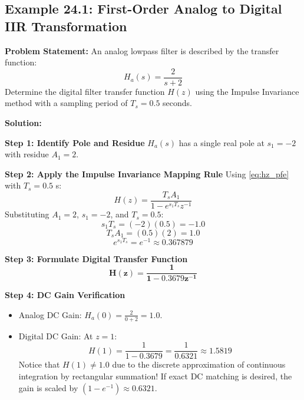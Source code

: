 \documentclass[11pt,a4paper]{article}
\begin{document}
\subsection{Example 24.1: First-Order Analog to Digital IIR Transformation}
\textbf{Problem Statement:} An analog lowpass filter is described by the transfer function:
\begin{equation}
H_a(s) = \frac{2}{s + 2}
\end{equation}
Determine the digital filter transfer function $H(z)$ using the Impulse Invariance method with a sampling period of $T_s = 0.5$ seconds.

\vspace{1mm}
\noindent\textbf{Solution:}

\noindent\textbf{Step 1: Identify Pole and Residue}
$H_a(s)$ has a single real pole at $s_1 = -2$ with residue $A_1 = 2$.

\noindent\textbf{Step 2: Apply the Impulse Invariance Mapping Rule}
Using \eqref{eq:hz_pfe} with $T_s = 0.5$ s:
\begin{equation}
H(z) = \frac{T_s A_1}{1 - e^{s_1 T_s} z^{-1}}
\end{equation}
Substituting $A_1 = 2$, $s_1 = -2$, and $T_s = 0.5$:
\begin{equation}
s_1 T_s = (-2)(0.5) = -1.0
\end{equation}
\begin{equation}
T_s A_1 = (0.5)(2) = 1.0
\end{equation}
\begin{equation}
e^{s_1 T_s} = e^{-1} \approx 0.367879
\end{equation}

\noindent\textbf{Step 3: Formulate Digital Transfer Function}
\begin{equation}
\mathbf{H(z) = \frac{1}{1 - 0.3679 z^{-1}}}
\end{equation}

\noindent\textbf{Step 4: DC Gain Verification}
\begin{itemize}
    \item Analog DC Gain: $H_a(0) = \frac{2}{0 + 2} = 1.0$.
    \item Digital DC Gain: At $z = 1$:
    \begin{equation}
    H(1) = \frac{1}{1 - 0.3679} = \frac{1}{0.6321} \approx \mathbf{1.5819}
    \end{equation}
    Notice that $H(1) \ne 1.0$ due to the discrete approximation of continuous integration by rectangular summation! If exact DC matching is desired, the gain is scaled by $(1 - e^{-1}) \approx 0.6321$.
\end{itemize}
\end{document}
